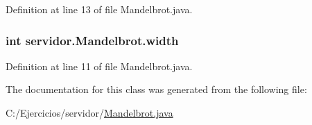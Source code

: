 Definition at line 13 of file Mandelbrot.\+java.

\subsubsection[{\texorpdfstring{width}{width}}]{\setlength{\rightskip}{0pt plus 5cm}int servidor.\+Mandelbrot.\+width\hspace{0.3cm}{\ttfamily [package]}}\hypertarget{classservidor_1_1Mandelbrot_afc820ea6c9992894d55fa4c024ee7fb1}{}\label{classservidor_1_1Mandelbrot_afc820ea6c9992894d55fa4c024ee7fb1}


Definition at line 11 of file Mandelbrot.\+java.



The documentation for this class was generated from the following file\+:\begin{DoxyCompactItemize}
\item 
C\+:/\+Ejercicios/servidor/\hyperlink{Mandelbrot_8java}{Mandelbrot.\+java}\end{DoxyCompactItemize}
